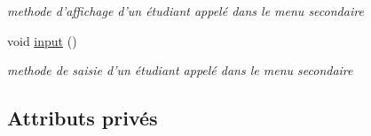 \begin{DoxyCompactItemize}
\begin{DoxyCompactList}\small\item\em methode d'affichage d'un étudiant appelé dans le menu secondaire \end{DoxyCompactList}\item 
\hypertarget{class_etudiant_a37433540e5c7b724de0964a5ecbbead8}{void \hyperlink{class_etudiant_a37433540e5c7b724de0964a5ecbbead8}{input} ()}\label{class_etudiant_a37433540e5c7b724de0964a5ecbbead8}

\begin{DoxyCompactList}\small\item\em methode de saisie d'un étudiant appelé dans le menu secondaire \end{DoxyCompactList}\end{DoxyCompactItemize}
\subsection*{Attributs privés}
